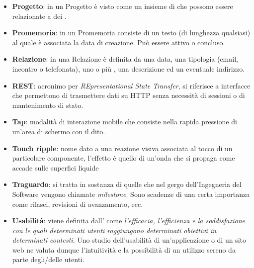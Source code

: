 \begin{itemize}
\item \textbf{Progetto}: in \fiscolo{} un Progetto è visto come un insieme di 
che possono essere relazionate a dei .

\item \textbf{Promemoria}: in \fiscolo{} un Promemoria consiste di un testo (di lunghezza
qualsiasi) al quale è associata la data di creazione. Può essere attivo o concluso.

\item \textbf{Relazione}: in \fiscolo{} una Relazione è definita da una data, una tipologia
(email, incontro o telefonata), uno o più , una descrizione ed un eventuale
indirizzo.

\item \textbf{REST}: acronimo per \textit{REpresentational State Transfer}, si riferisce a
interfacce che permettono di trasmettere dati su HTTP senza necessità di sessioni o di
mantenimento di stato.

\item \textbf{Tap}: modalità di interazione mobile che consiste nella rapida pressione
di un'area di schermo con il dito.

\item \textbf{Touch ripple}: nome dato a una reazione visiva associata al tocco di un
particolare componente, l'effetto è quello di un'onda che si propaga come accade sulle
superfici liquide

\item \textbf{Traguardo}: si tratta in sostanza di quelle che nel gergo dell'Ingegneria del
Software vengono chiamate \textit{milestone}. Sono scadenze di una certa importanza come
rilasci, revisioni di avanzamento, ecc.

\item \textbf{Usabilità}: viene definita dall' come \textit{l'efficacia, l'efficienza
e la soddisfazione con le quali determinati utenti raggiungono determinati obiettivi in
determinati contesti}. Uno studio dell'usabilità di un'applicazione o di un sito web ne valuta
dunque l'intuitività e la possibilità di un utilizzo sereno da parte degli/delle utenti.
\end{itemize}